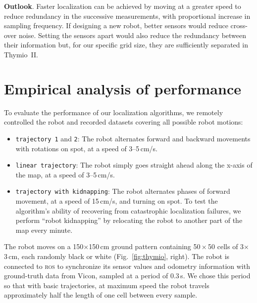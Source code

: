 \documentclass{svmult}
\newcommand{\fig}[1]{Fig.~\ref{fig:#1}}
\begin{document}
\textbf{Outlook}. Faster localization can be achieved by moving at a greater speed to reduce redundancy in the successive measurements, with proportional increase in sampling frequency.
If designing a new robot, better sensors would reduce cross-over noise.
Setting the sensors apart would also reduce the redundancy between their information but, for our specific grid size, they are sufficiently separated in Thymio~II.

\section{Empirical analysis of performance}
\label{sec:results}


To evaluate the performance of our localization algorithms, we remotely controlled the robot and recorded datasets covering all possible robot motions:
\begin{itemize}
\item \texttt{trajectory 1} and \texttt{2}: The robot alternates forward and backward movements with rotations on spot, at a speed of 3--5\,cm/s. %
\item \texttt{linear trajectory}: The robot simply goes straight ahead along the x-axis of the map, at a speed of 3--5\,cm/s.
\item \texttt{trajectory with kidnapping}: The robot alternates phases of forward movement, at a speed of 15\,cm/s, and turning on spot.
To test the algorithm's ability of recovering from catastrophic localization failures, we perform ``robot kidnapping'' by relocating the robot to another part of the map every minute.
\end{itemize}
The robot moves on a 150$\times$150\,cm ground pattern containing 50\,$\times$\,50 cells of 3$\times$3\,cm, each randomly black or white (\fig{thymio}, right).
The robot is connected to \textsc{ros} to synchronize its sensor values and odometry information with ground-truth data from Vicon, sampled at a period of 0.3\,s.
We chose this period so that with basic trajectories, at maximum speed the robot travels approximately half the length of one cell between every sample.
\end{document}
